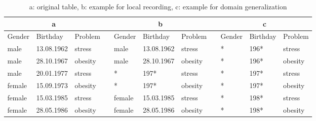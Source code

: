 \documentclass{llncs}
\begin{document}
	
\begin{table}[]
	\centering
	\caption{a: original table, b: example for local recording, c: example for domain generalization }
	\label{table_distortion}
	\begin{tabular}{@{}lllllllllll@{}}
		\multicolumn{3}{c}{\textbf{a}} &           & \multicolumn{3}{c}{\textbf{b}} &  & \multicolumn{3}{c}{\textbf{c}} \\ \midrule
		Gender  & Birthday   & Problem & \textbf{} & Gender  & Birthday   & Problem &  & Gender  & Birthday  & Problem  \\ \midrule
		male    & 13.08.1962 & stress  &           & male    & 13.08.1962 & stress  &  & *       & 196*      & stress   \\
		male    & 28.10.1967 & obesity &           & male    & 28.10.1967 & obesity &  & *       & 196*      & obesity  \\
		male    & 20.01.1977 & stress  &           & *       & 197*       & stress  &  & *       & 197*      & stress   \\
		female  & 15.09.1973 & obesity &           & *       & 197*       & obesity &  & *       & 197*      & obesity  \\
		female  & 15.03.1985 & stress  &           & female  & 15.03.1985 & stress  &  & *       & 198*      & stress   \\
		female  & 28.05.1986 & obesity &           & female  & 28.05.1986 & obesity &  & *       & 198*      & obesity  \\ \bottomrule
	\end{tabular}
\end{table}
\end{document}
